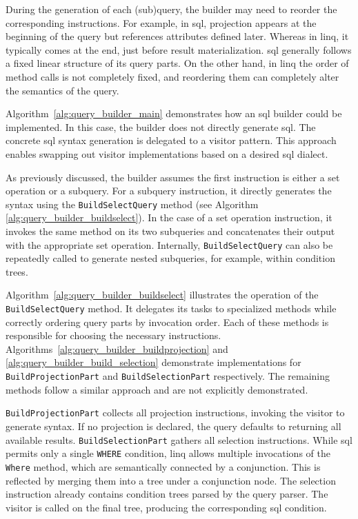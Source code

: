  
During the generation of each (sub)query, the builder may need to reorder the corresponding instructions. For example, in \acrshort{sql}, projection appears at the beginning of the query but references attributes defined later. Whereas in \acrshort{linq}, it typically comes at the end, just before result materialization. \acrshort{sql} generally follows a fixed linear structure of its query parts. On the other hand, in \acrshort{linq} the order of method calls is not completely fixed, and reordering them can completely alter the semantics of the query.

Algorithm~\ref{alg:query_builder_main} demonstrates how an \acrshort{sql} builder could be implemented. In this case, the builder does not directly generate \acrshort{sql}. The concrete \acrshort{sql} syntax generation is delegated to a visitor pattern. This approach enables swapping out visitor implementations based on a desired \acrshort{sql} dialect.

As previously discussed, the builder assumes the first instruction is either a set operation or a subquery. For a subquery instruction, it directly generates the syntax using the \texttt{BuildSelectQuery} method (see Algorithm \ref{alg:query_builder_buildselect}). In the case of a set operation instruction, it invokes the same method on its two subqueries and concatenates their output with the appropriate set operation. Internally, \texttt{BuildSelectQuery} can also be repeatedly called to generate nested subqueries, for example, within condition trees.

Algorithm~\ref{alg:query_builder_buildselect} illustrates the operation of the \texttt{BuildSelectQuery} method. It delegates its tasks to specialized methods while correctly ordering query parts by invocation order. Each of these methods is responsible for choosing the necessary instructions. Algorithms~\ref{alg:query_builder_buildprojection} and \ref{alg:query_builder_build_selection} demonstrate implementations for \texttt{BuildProjectionPart} and \texttt{BuildSelectionPart} respectively. The remaining methods follow a similar approach and are not explicitly demonstrated.

\texttt{BuildProjectionPart} collects all projection instructions, invoking the visitor to generate syntax. If no projection is declared, the query defaults to returning all available results. \texttt{BuildSelectionPart} gathers all selection instructions. While \acrshort{sql} permits only a single \texttt{WHERE} condition, \acrshort{linq} allows multiple invocations of the \texttt{Where} method, which are semantically connected by a conjunction. This is reflected by merging them into a tree under a conjunction node. The selection instruction already contains condition trees parsed by the query parser. The visitor is called on the final tree, producing the corresponding \acrshort{sql} condition.

